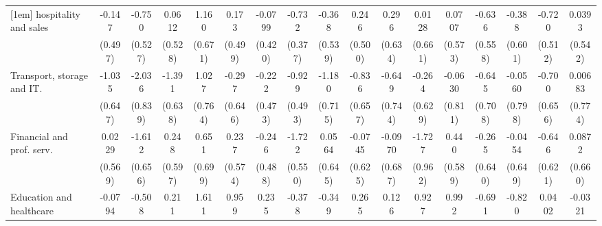 {\begin{tabular}{l*{16}{c}}
[1em]
hospitality and sales&      -0.147         &      -0.750         &      0.0612         &       1.160         &       0.173         &     -0.0799         &      -0.732         &      -0.368         &       0.246         &       0.296         &      0.0128         &      0.0707         &      -0.636         &      -0.388         &      -0.720         &      0.0393         \\
                    &     (0.497)         &     (0.527)         &     (0.528)         &     (0.671)         &     (0.499)         &     (0.420)         &     (0.377)         &     (0.539)         &     (0.500)         &     (0.634)         &     (0.661)         &     (0.573)         &     (0.558)         &     (0.601)         &     (0.512)         &     (0.542)         \\
[1em]
Transport, storage and IT.&      -1.035         &      -2.036\sym{*}  &      -1.391\sym{*}  &       1.027         &      -0.297         &      -0.222         &      -0.929         &      -1.180         &      -0.836         &      -0.649         &      -0.264         &     -0.0630         &      -0.645         &     -0.0560         &      -0.700         &     0.00683         \\
                    &     (0.647)         &     (0.839)         &     (0.638)         &     (0.764)         &     (0.646)         &     (0.473)         &     (0.493)         &     (0.715)         &     (0.657)         &     (0.744)         &     (0.629)         &     (0.811)         &     (0.708)         &     (0.798)         &     (0.656)         &     (0.774)         \\
[1em]
Financial and prof. serv.&      0.0229         &      -1.612\sym{*}  &       0.248         &       0.651         &       0.237         &      -0.246         &      -1.722\sym{**} &      0.0564         &     -0.0745         &     -0.0970         &      -1.727         &       0.440         &      -0.265         &     -0.0454         &      -0.646         &      0.0872         \\
                    &     (0.569)         &     (0.656)         &     (0.597)         &     (0.699)         &     (0.574)         &     (0.488)         &     (0.550)         &     (0.645)         &     (0.625)         &     (0.687)         &     (0.962)         &     (0.589)         &     (0.640)         &     (0.649)         &     (0.621)         &     (0.660)         \\
[1em]
Education and healthcare&     -0.0794         &      -0.508         &       0.211         &       1.611\sym{*}  &       0.959         &       0.235         &      -0.378         &      -0.349         &       0.265         &       0.126         &       0.927         &       0.992         &      -0.691         &      -0.820         &      0.0402         &     -0.0321         \\

\end{tabular}}
